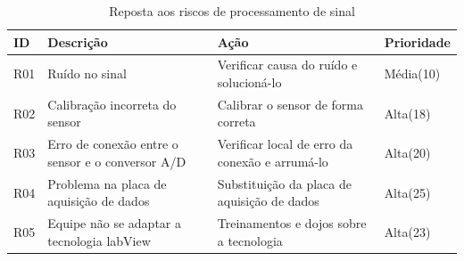 \begin{table}[h]
    \centering
    \begin{tabular}{|p{1cm}|p{2cm}|p{2cm}|p{2cm}|}
        \hline
        \textbf{ID}  & \textbf{Descrição} & \textbf{Ação} & \textbf{Prioridade} \\ \hline
        R01 &Ruído no sinal &Verificar causa do ruído e solucioná-lo & Média(10) \\ \hline
        R02 &Calibração incorreta do sensor &Calibrar o sensor de forma correta &Alta(18) \\ \hline
        R03 &Erro de conexão entre o sensor e o conversor A/D &Verificar local de erro da conexão e arrumá-lo &Alta(20) \\ \hline
        R04 &Problema na placa de aquisição de dados &Substituição da placa de aquisição de dados &Alta(25) \\ \hline
        R05 &Equipe não se adaptar a tecnologia labView &Treinamentos e dojos sobre a tecnologia &Alta(23) \\ \hline
    \end{tabular}
\caption{Reposta aos riscos de processamento de sinal}
\end{table}